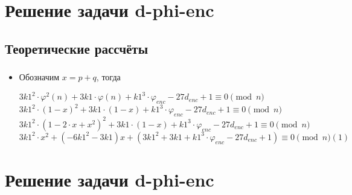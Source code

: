 \documentclass[t]{beamer}
\begin{document}
\section{Решение задачи d-phi-enc}
\subsection{Теоретические рассчёты}
\begin{frame}[t] %
	\frametitle{\insertsection}
	\framesubtitle{\insertsubsection}
        \begin{itemize}
            \item Обозначим $x=p+q$, тогда\newline
            \begin{center}
                \( 3k1^2 \cdot \varphi^2(n) + 3k1 \cdot \varphi(n) + k1^3 
                \cdot \varphi_{enc} - 27d_{enc} + 1 \equiv 0 \pmod{n} \)\newline
                \( 3k1^2 \cdot (1-x)^2 + 3k1 \cdot (1-x) + k1^3 \cdot \varphi_{enc} - 27d_{enc} + 1 \equiv 0 \pmod{n} \)\newline
                \( 3k1^2 \cdot (1-2 \cdot x+x^2)^2 + 3k1 \cdot (1-x) + k1^3 
                \cdot \varphi_{enc} - 27d_{enc} + 1 \equiv 0 \pmod{n} \)\newline
                \( 3k1^2 \cdot x^2 + (-6k1^2-3k1)x + (3k1^2+3k1+k1^3 \cdot \varphi_{enc} - 27d_{enc} + 1) \equiv 0 \pmod{n} (1) \)
            \end{center}
	\end{itemize}
\end{frame}

\section{Решение задачи d-phi-enc}
\end{document}
